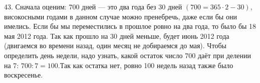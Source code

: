 43. Сначала оценим: 700 дней --- это два года без 30 дней $(700=365\cdot2-30),$ високосными годами в данном случае можно пренебречь, даже если бы они имелись. Если бы мы переместились в прошлое ровно на два года, то было бы 18 мая 2012 года. Так как прошло на 30 дней меньше, будет июнь 2012 года (двигаемся во времени назад, один месяц не добираемся до мая). Чтобы определить день недели, надо узнать, какой остаток число 700 даёт при делении на 7: $700:7=100.$Так как остатка нет, ровно 100 недель назад также было воскресенье.\\
